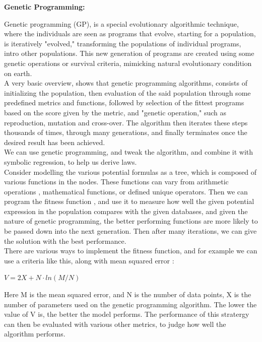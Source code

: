 \documentclass{article}
\begin{document}
\begin{center} 
  \textbf {\Large Genetic Programming:}
\end{center}


Genetic programming (GP), is a special evolutionary algorithmic technique, where the individuals are seen as programs that evolve, starting for a population, is iteratively "evolved," transforming the populations of individual programs, intro other populations. This new generation of programs are created using some genetic operations or survival criteria, mimicking natural evolutionary condition on earth.\\ 

A very basic overview, shows that genetic programming algorithms, consists of initializing the population, then evaluation of the said population through some predefined metrics and functions, followed by selection of the fittest programs based on the score given by the metric, and "genetic operation," such as reproduction, mutation and cross-over. The algorithm then iterates these steps thousands of times, through many generations, and finally terminates once the desired result has been achieved.\\

We can use genetic programming, and tweak the algorithm, and combine it with symbolic regression, to help us derive laws. \\

Consider modelling the various potential formulas as a tree, which is composed of various functions in the nodes. These functions can vary from arithmetic operations  , mathematical functions, or defined unique operators. Then we can program the fitness function \cite{Angeline1994}, and use it to measure how well the given potential expression in the population compares with the given databases, and given the nature of genetic programming, the better performing functions are more likely to be passed down into the next generation. Then after many iterations, we can give the solution with the best performance. \\ 

There are various ways to implement the fitness function, and for example we can use a criteria like this, along with mean squared error \cite{Liddle2009}:\\

\begin{center}
  $V = 2X + N \cdot ln(M/N) $
\end{center}

Here M is the mean squared error, and N is the number of data points, X is the number of parameters used on the genetic programming algorithm. The lower the value of V is, the better the model performs. The performance of this stratergy can then be evaluated with various other metrics, to judge how well the algorithm performs. \\ 
\end{document}
